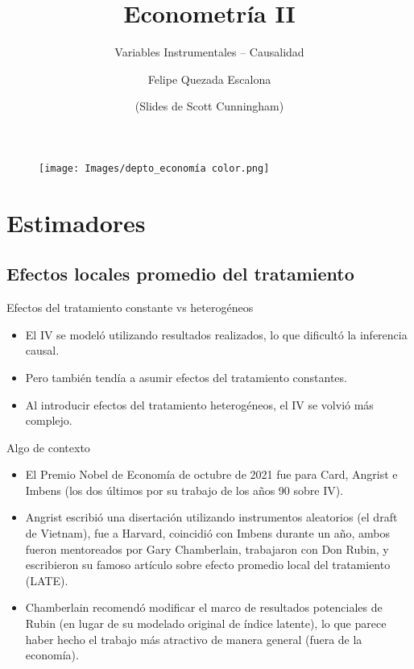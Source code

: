 \documentclass{beamer}
\title[Econometría II]{Econometría II}
\subtitle{Variables Instrumentales -- Causalidad}
\author[Felipe Quezada]{Felipe Quezada Escalona}
\date{(Slides de Scott Cunningham)}
\begin{document}
\begin{frame}[plain]
\begin{figure}
    \hspace{-8.75cm} \texttt{[image: Images/depto\_economía color.png]}
    \textbf{}
\end{figure}
\vspace{-15pt}
\titlepage
\end{frame}



\section{Estimadores}

\subsection{Efectos locales promedio del tratamiento}

\begin{frame}{Efectos del tratamiento constante vs heterogéneos}

\begin{itemize}
\item El IV se modeló utilizando resultados realizados, lo que dificultó la inferencia causal.
\item Pero también tendía a asumir efectos del tratamiento constantes.
\item Al introducir efectos del tratamiento heterogéneos, el IV se volvió más complejo.
\end{itemize}

\end{frame}

\begin{frame}{Algo de contexto}

\begin{itemize}
\item El Premio Nobel de Economía de octubre de 2021 fue para Card, Angrist e Imbens (los dos últimos por su trabajo de los años 90 sobre IV).
\item Angrist escribió una disertación utilizando instrumentos aleatorios (el draft de Vietnam), fue a Harvard, coincidió con Imbens durante un año, ambos fueron mentoreados por Gary Chamberlain, trabajaron con Don Rubin, y escribieron su famoso artículo sobre efecto promedio local del tratamiento (LATE).
\item Chamberlain recomendó modificar el marco de resultados potenciales de Rubin (en lugar de su modelado original de índice latente), lo que parece haber hecho el trabajo más atractivo de manera general (fuera de la economía).
\end{itemize}

\end{frame}
\end{document}
